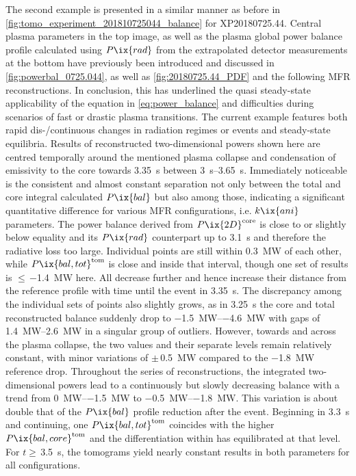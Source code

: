                     The second example is presented in a similar manner as before in \cref{fig:tomo_experiment_201810725044_balance} for XP20180725.44. Central plasma parameters in the top image, as well as the plasma global power balance profile calculated using $P\ix{rad}$ from the extrapolated detector measurements at the bottom have previously been introduced and discussed in \cref{fig:powerbal_0725.044}, as well as \cref{fig:20180725.44_PDF} and the following MFR reconstructions. In conclusion, this has underlined the quasi steady-state applicability of the equation in \cref{eq:power_balance} and difficulties during scenarios of fast or drastic plasma transitions. The current example features both rapid dis-/continuous changes in radiation regimes or events and steady-state equilibria. Results of reconstructed two-dimensional powers shown here are centred temporally around the mentioned plasma collapse and condensation of emissivity to the core towards \SI{3.35}{\second} between \SIrange{3}{3.65}{\second}. Immediately noticeable is the consistent and almost constant separation not only between the total and core integral calculated $P\ix{bal}$ but also among those, indicating a significant quantitative difference for various MFR configurations, i.e. $k\ix{ani}$ parameters. The power balance derived from $P\ix{2D}^{\text{core}}$ is close to or slightly below equality and its $P\ix{rad}$ counterpart up to \SI{3.1}{\second} and therefore the radiative loss too large. Individual points are still within \SI{0.3}{\mega\watt} of each other, while $P\ix{bal,tot}^{\text{tom}}$ is close and inside that interval, though one set of results is $\le$\,\SI{-1.4}{\mega\watt} here. All decrease further and hence increase their distance from the reference profile with time until the event in \SI{3.35}{\second}. The discrepancy among the individual sets of points also slightly grows, as in \SI{3.25}{\second} the core and total reconstructed balance suddenly drop to \SIrange{-1.5}{-4.6}{\mega\watt} with gaps of \SIrange{1.4}{2.6}{\mega\watt} in a singular group of outliers. However, towards and across the plasma collapse, the two values and their separate levels remain relatively constant, with minor variations of $\pm$\,\SI{0.5}{\mega\watt} compared to the \SI{-1.8}{\mega\watt} reference drop. Throughout the series of reconstructions, the integrated two-dimensional powers lead to a continuously but slowly decreasing balance with a trend from \SIrange{0}{-1.5}{\mega\watt} to \SIrange{-0.5}{-1.8}{\mega\watt}. This variation is about double that of the $P\ix{bal}$ profile reduction after the event. Beginning in \SI{3.3}{\second} and continuing, one $P\ix{bal,tot}^{\text{tom}}$ coincides with the higher $P\ix{bal,core}^{\text{tom}}$ and the differentiation within has equilibrated at that level. For $t\ge$\,\SI{3.5}{\second}, the tomograms yield nearly constant results in both parameters for all configurations.\\%
